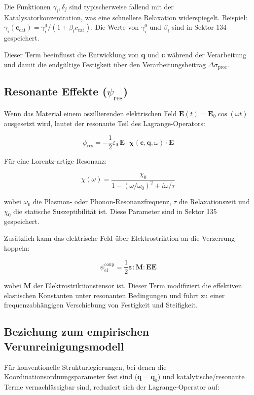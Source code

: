 \documentclass[12pt,a4paper]{article}
\begin{document}
Die Funktionen \(\gamma_i, \delta_j\) sind typischerweise fallend mit der Katalysatorkonzentration, was eine schnellere Relaxation widerspiegelt. Beispiel: \(\gamma_i(\mathbf{c}_{\mathrm{cat}}) = \gamma_i^0 / (1 + \beta_i c_{\mathrm{cat}})\). Die Werte von \(\gamma_i^0\) und \(\beta_i\) sind in Sektor 134 gespeichert.

Dieser Term beeinflusst die Entwicklung von \(\mathbf{q}\) und \(\mathbf{c}\) während der Verarbeitung und damit die endgültige Festigkeit über den Verarbeitungsbeitrag \(\Delta\sigma_{\mathrm{proc}}\).

\subsection{Resonante Effekte (\(\psi_{\mathrm{res}}\))}
\label{subsec:resonance}

Wenn das Material einem oszillierenden elektrischen Feld \(\mathbf{E}(t) = \mathbf{E}_0 \cos(\omega t)\) ausgesetzt wird, lautet der resonante Teil des Lagrange-Operators:

\[
\psi_{\mathrm{res}} = -\frac{1}{2}\varepsilon_0\, \mathbf{E} \cdot \boldsymbol{\chi}(\mathbf{c}, \mathbf{q}, \omega) \cdot \mathbf{E}
\]

Für eine Lorentz-artige Resonanz:

\[
\chi(\omega) = \frac{\chi_0}{1 - (\omega/\omega_0)^2 + i\omega/\tau}
\]

wobei \(\omega_0\) die Plasmon- oder Phonon-Resonanzfrequenz, \(\tau\) die Relaxationszeit und \(\chi_0\) die statische Suszeptibilität ist. Diese Parameter sind in Sektor 135 gespeichert.

Zusätzlich kann das elektrische Feld über Elektrostriktion an die Verzerrung koppeln:

\[
\psi_{\mathrm{el}}^{\mathrm{coup}} = \frac{1}{2} \boldsymbol{\varepsilon} : \mathbf{M} : \mathbf{E}\mathbf{E}
\]

wobei \(\mathbf{M}\) der Elektrostriktionstensor ist. Dieser Term modifiziert die effektiven elastischen Konstanten unter resonanten Bedingungen und führt zu einer frequenzabhängigen Verschiebung von Festigkeit und Steifigkeit.

\subsection{Beziehung zum empirischen Verunreinigungsmodell}
\label{subsec:relation-empirical}

Für konventionelle Strukturlegierungen, bei denen die Koordinationsordnungsparameter fest sind (\(\mathbf{q} = \mathbf{q}_0\)) und katalytische/resonante Terme vernachlässigbar sind, reduziert sich der Lagrange-Operator auf:
\end{document}
